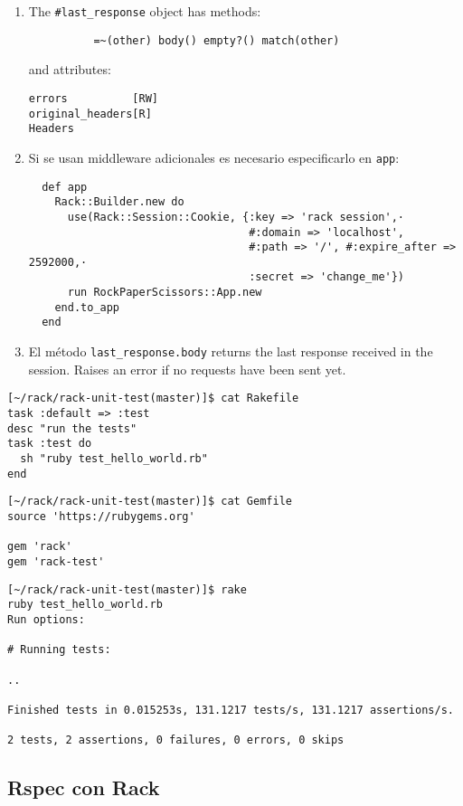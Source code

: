 \begin{enumerate}
\item 
The \verb|#last_response| object has methods:
\begin{verbatim}
          =~(other) body() empty?() match(other)
\end{verbatim}
and attributes:
\begin{verbatim}
errors          [RW]
original_headers[R]
Headers
\end{verbatim}
\item 
Si se usan middleware adicionales es necesario especificarlo 
en \verb|app|:
\begin{verbatim}
  def app 
    Rack::Builder.new do
      use(Rack::Session::Cookie, {:key => 'rack session',·
                                  #:domain => 'localhost',
                                  #:path => '/', #:expire_after => 2592000,·
                                  :secret => 'change_me'})
      run RockPaperScissors::App.new
    end.to_app
  end 

\end{verbatim}
\item 
El método 
\verb|last_response.body|
returns the last response received in the session. Raises an error
if no requests have been sent yet.
\end{enumerate}


\begin{verbatim}
[~/rack/rack-unit-test(master)]$ cat Rakefile 
task :default => :test
desc "run the tests"
task :test do
  sh "ruby test_hello_world.rb"
end 
\end{verbatim}

\begin{verbatim}
[~/rack/rack-unit-test(master)]$ cat Gemfile
source 'https://rubygems.org'

gem 'rack'
gem 'rack-test'
\end{verbatim}


\begin{verbatim}
[~/rack/rack-unit-test(master)]$ rake
ruby test_hello_world.rb
Run options: 

# Running tests:

..

Finished tests in 0.015253s, 131.1217 tests/s, 131.1217 assertions/s.

2 tests, 2 assertions, 0 failures, 0 errors, 0 skips
\end{verbatim}



\subsection{Rspec con Rack}
\label{subsection:rspecconrack}


